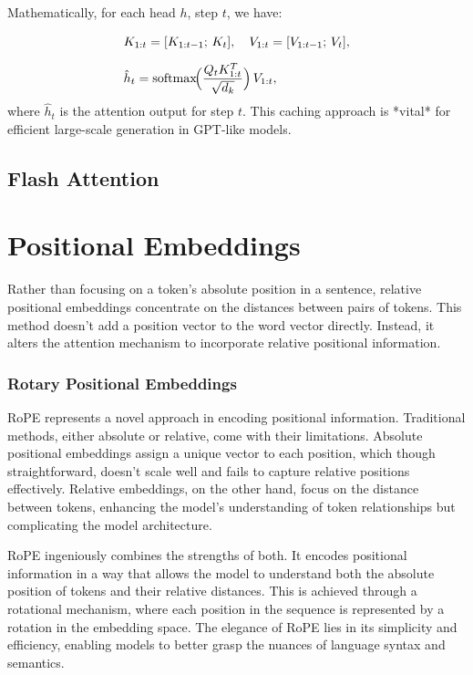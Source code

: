 Mathematically, for each head \(h\), step \(t\), we have:

\[
\begin{aligned}
&K_{1:t} = [K_{1:t-1};\, K_t], 
\quad
V_{1:t} = [V_{1:t-1};\, V_t], \\[6pt]
&\hat{h}_t = 
\mathrm{softmax}\!\Bigl(\frac{Q_t K_{1:t}^T}{\sqrt{d_k}}\Bigr)\, V_{1:t},
\end{aligned}
\]
where \(\hat{h}_t\) is the attention output for step \(t\). This caching approach is *vital* for efficient large-scale generation in GPT-like models.


\section{Flash Attention}
\label{sec:transformer:flash_attention}

\chapter{Positional Embeddings}
\label{ch:transformer:posemb}

Rather than focusing on a token's absolute position in a sentence, relative positional embeddings concentrate on the distances between pairs of tokens. This method doesn't add a position vector to the word vector directly. Instead, it alters the attention mechanism to incorporate relative positional information.

\subsection{Rotary Positional Embeddings}
RoPE represents a novel approach in encoding positional information. Traditional methods, either absolute or relative, come with their limitations. Absolute positional embeddings assign a unique vector to each position, which though straightforward, doesn't scale well and fails to capture relative positions effectively. Relative embeddings, on the other hand, focus on the distance between tokens, enhancing the model’s understanding of token relationships but complicating the model architecture.

RoPE ingeniously combines the strengths of both. It encodes positional information in a way that allows the model to understand both the absolute position of tokens and their relative distances. This is achieved through a rotational mechanism, where each position in the sequence is represented by a rotation in the embedding space. The elegance of RoPE lies in its simplicity and efficiency, enabling models to better grasp the nuances of language syntax and semantics.

